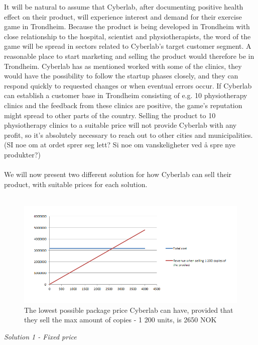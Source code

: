 It will be natural to assume that Cyberlab, after documenting positive health effect on their product, will experience interest and demand for their exercise game in Trondheim. Because the product is being developed in Trondheim with close relationship to the hospital, scientist and physiotherapists, the word of the game will be spread in sectors related to Cyberlab's target customer segment. A reasonable place to start marketing and selling the product would therefore be in Trondheim. Cyberlab has as mentioned worked with some of the clinics, they would have the possibility to follow the startup phases closely, and they can respond quickly to requested changes or when eventual errors occur. If Cyberlab can establish a customer base in Trondheim consisting of e.g. 10 physiotherapy clinics and the feedback from these clinics are positive, the game’s reputation might spread to other parts of the country. Selling the product to 10 physiotherapy clinics to a suitable price will not provide Cyberlab with any profit, so it’s absolutely necessary to reach out to other cities and municipalities. (SI noe om at ordet sprer seg lett? Si noe om vanskeligheter ved {å} spre nye produkter?)\\ \\
We will now present two different solution for how Cyberlab can sell their product, with suitable prices for each solution.\\ \\
\begin{figure}
\label{fig:RevenueStreamPrice}
\begin{center}
\includegraphics[scale=0.7]{revenuestreamprice}
\caption[Price example]{The lowest possible package price Cyberlab can have, provided that they sell the max amount of  copies - 1 200 units, is 2650 NOK}
\end{center}
\end{figure}
\emph{Solution 1 - Fixed price}\\ 
